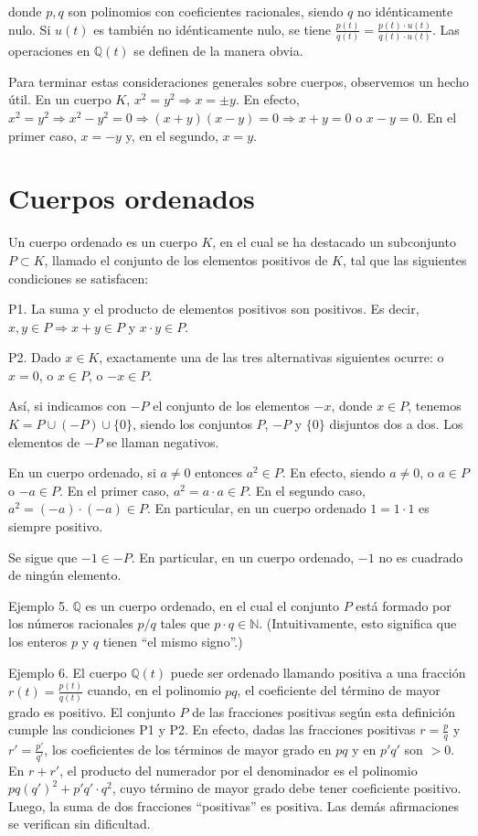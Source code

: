 \documentclass[12pt,oneside]{book}
\begin{document}
donde \(p, q\) son polinomios con coeficientes racionales, siendo \(q\) no idénticamente nulo. Si \(u(t)\) es también no idénticamente nulo, se tiene \(\frac{p(t)}{q(t)} = \frac{p(t) \cdot u(t)}{q(t) \cdot u(t)}\). Las operaciones en \(\mathbb{Q}(t)\) se definen de la manera obvia.

Para terminar estas consideraciones generales sobre cuerpos, observemos un hecho útil. En un cuerpo \(K\), \(x^2 = y^2 \Rightarrow x = \pm y\). En efecto, \(x^2 = y^2 \Rightarrow x^2 - y^2 = 0 \Rightarrow (x + y)(x - y) = 0 \Rightarrow x + y = 0\) o \(x - y = 0\). En el primer caso, \(x = -y\) y, en el segundo, \(x = y\).

\section{Cuerpos ordenados}

Un cuerpo ordenado es un cuerpo \(K\), en el cual se ha destacado un subconjunto \(P \subset K\), llamado el conjunto de los elementos positivos de \(K\), tal que las siguientes condiciones se satisfacen:

P1. La suma y el producto de elementos positivos son positivos. Es decir, \(x, y \in P \Rightarrow x + y \in P\) y \(x \cdot y \in P\).

P2. Dado \(x \in K\), exactamente una de las tres alternativas siguientes ocurre: o \(x = 0\), o \(x \in P\), o \(-x \in P\).

Así, si indicamos con \(-P\) el conjunto de los elementos \(-x\), donde \(x \in P\), tenemos \(K = P \cup (-P) \cup \{0\}\), siendo los conjuntos \(P\), \(-P\) y \(\{0\}\) disjuntos dos a dos. Los elementos de \(-P\) se llaman negativos.

En un cuerpo ordenado, si \(a \neq 0\) entonces \(a^2 \in P\). En efecto, siendo \(a \neq 0\), o \(a \in P\) o \(-a \in P\). En el primer caso, \(a^2 = a \cdot a \in P\). En el segundo caso, \(a^2 = (-a) \cdot (-a) \in P\). En particular, en un cuerpo ordenado \(1 = 1 \cdot 1\) es siempre positivo.

Se sigue que \(-1 \in -P\). En particular, en un cuerpo ordenado, \(-1\) no es cuadrado de ningún elemento.

Ejemplo 5. \(\mathbb{Q}\) es un cuerpo ordenado, en el cual el conjunto \(P\) está formado por los números racionales \(p/q\) tales que \(p \cdot q \in \mathbb{N}\). (Intuitivamente, esto significa que los enteros \(p\) y \(q\) tienen “el mismo signo”.)

Ejemplo 6. El cuerpo \(\mathbb{Q}(t)\) puede ser ordenado llamando positiva a una fracción \(r(t) = \frac{p(t)}{q(t)}\) cuando, en el polinomio \(pq\), el coeficiente del término de mayor grado es positivo. El conjunto \(P\) de las fracciones positivas según esta definición cumple las condiciones P1 y P2. En efecto, dadas las fracciones positivas \(r = \frac{p}{q}\) y \(r' = \frac{p'}{q'}\), los coeficientes de los términos de mayor grado en \(pq\) y en \(p'q'\) son \(> 0\). En \(r + r'\), el producto del numerador por el denominador es el polinomio \(pq(q')^2 + p'q' \cdot q^2\), cuyo término de mayor grado debe tener coeficiente positivo. Luego, la suma de dos fracciones “positivas” es positiva. Las demás afirmaciones se verifican sin dificultad.
\end{document}
